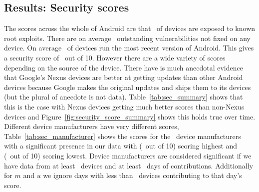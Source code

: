 \subsection{Results: Security scores}\label{sec:security_scoring:results}
The scores across the whole of Android are that \daMeanInsecurityPerc\ of devices are exposed to known root exploits.
There are on average \daMeanOutstandingVulnerabilities\ outstanding vulnerabilities not fixed on any device.
On average \daUpdatednessPerc\ of devices run the most recent version of Android.
This gives a security score of \daSecurityScore\ out of 10.
\daTabSecScoressummary
However there are a wide variety of scores depending on the source of the device.
There have is much anecdotal evidence that Google's Nexus devices are better at getting updates than other Android devices because Google makes the original updates and ships them to its devices (but the plural of anecdote is not data).
Table~\ref{tab:sec_summary} shows that this is the case with Nexus devices getting much better scores than non-Nexus devices and Figure~\ref{fig:security_score_summary} shows this holds true over time.
\daTabSecScoresmanufacturer
Different device manufacturers have very different scores, Table~\ref{tab:sec_manufacturer} shows the scores for the \daNumSigManufacturers\ device manufacturers with a significant presence in our data with \emph{\daSecScoreBestmanufacturer} (\daSecScoreBestmanufacturerScore\ out of 10) scoring highest and \emph{\daSecScoreWorstmanufacturer} (\daSecScoreWorstmanufacturerScore\ out of 10) scoring lowest.
Device manufacturers are considered significant if we have data from at least \daSigNumDevices\ devices and at least \daSigNumDeviceDays\ days of contributions.
Additionally for $m$ and $u$ we ignore days with less than \daSigNumDevicesDay\ devices contributing to that day's score.

